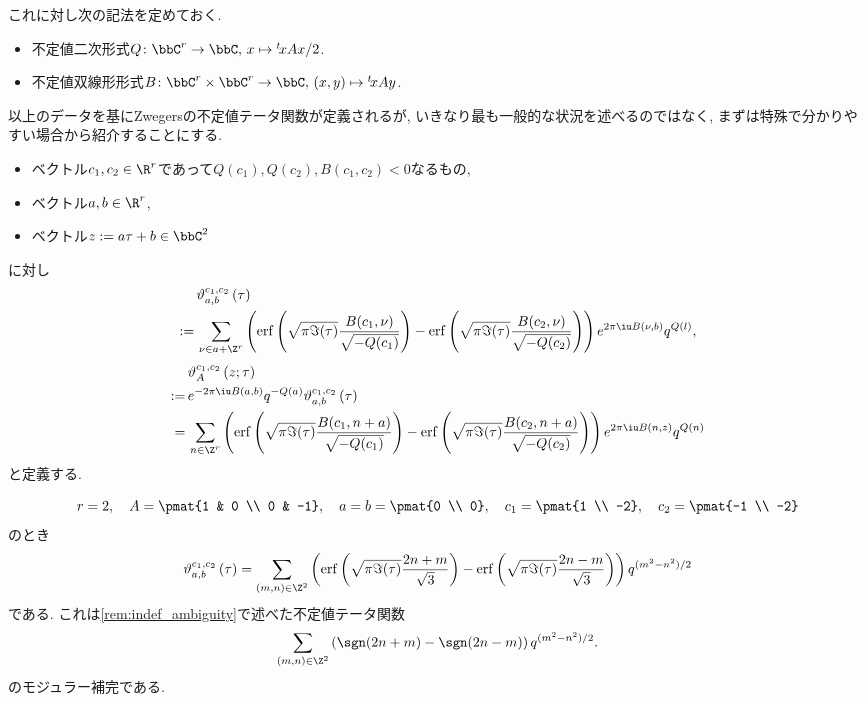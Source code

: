 \documentclass[11pt,b5paper,oneside,lualatex]{ltjsarticle} %
\DeclareMathOperator{\erf}{erf}
\numberwithin{equation}{section} %
\begin{document}
これに対し次の記法を定めておく. 

\begin{nota}
	\begin{itemize}
		\item 不定値二次形式$ Q \colon \bbC^r \to \bbC, \, x \mapsto {}^t\!x A x /2 $.
		\item 不定値双線形形式$ B \colon \bbC^r \times \bbC^r \to \bbC, \, (x, y) \mapsto {}^t\!x A y $.
	\end{itemize}
\end{nota}

以上のデータを基にZwegersの不定値テータ関数が定義されるが, いきなり最も一般的な状況を述べるのではなく, まずは特殊で分かりやすい場合から紹介することにする. 

\begin{dfn}
	\label{dfn:Zwegers_theta_special}
	\leavevmode %
	\begin{itemize}
		\item ベクトル$ c_1, c_2 \in \R^r $であって$ Q(c_1), Q(c_2), B(c_1, c_2) < 0 $なるもの,
		\item ベクトル$ a, b \in \R^r $,
		\item ベクトル$ z := a \tau + b \in \bbC^2 $
	\end{itemize}
	に対し	
	\begin{align}
		&\vartheta_{a, b}^{c_1, c_2} \left( \tau \right)
		\\
		:= \,
		&\sum_{\nu \in a + \Z^r}
		\left( \erf \left( \sqrt{\pi \Im(\tau)} \frac{B(c_1, \nu)}{\sqrt{-Q(c_1)}} \right) - \erf \left( \sqrt{\pi \Im(\tau)} \frac{B(c_2, \nu)}{\sqrt{-Q(c_2)}} \right) \right)
		e^{2\pi \iu B(\nu, b)} q^{Q(l)},
	\end{align}
	\begin{align}
		&\vartheta_{A}^{c_1, c_2} \left( z; \tau \right)
		\\
		:= \,
		&e^{-2\pi \iu B(a, b)} q^{-Q(a)} \vartheta_{a, b}^{c_1, c_2} \left( \tau \right)
		\\
		= \,
		&\sum_{n \in \Z^r}
		\left( \erf \left( \sqrt{\pi \Im(\tau)} \frac{B(c_1, n + a)}{\sqrt{-Q(c_1)}} \right) - \erf \left( \sqrt{\pi \Im(\tau)} \frac{B(c_2, n + a)}{\sqrt{-Q(c_2)}} \right) \right)
		e^{2\pi \iu B(n, z)} q^{Q(n)}
	\end{align}
	と定義する. 
\end{dfn}

\begin{ex}
	\[
	 r = 2, \quad
	 A = \pmat{1 & 0 \\ 0 & -1}, \quad
	 a = b = \pmat{0 \\ 0}, \quad
	 c_1= \pmat{1 \\ -2}, \quad
	 c_2= \pmat{-1 \\ -2}
	\]
	のとき
	\[
	\vartheta_{a, b}^{c_1, c_2} \left( \tau \right)
	=
	\sum_{(m, n) \in \Z^2}
	\left( \erf \left( \sqrt{\pi \Im(\tau)} \frac{2n+m}{\sqrt{3}} \right) - \erf \left( \sqrt{\pi \Im(\tau)} \frac{2n-m}{\sqrt{3}} \right) \right)
	q^{(m^2 - n^2)/2}
	\]
	である. 
	これは\cref{rem:indef_ambiguity}で述べた不定値テータ関数
	\[
	\sum_{(m, n) \in \Z^2} \left( \sgn(2n+m) - \sgn(2n-m) \right) q^{(m^2 - n^2)/2}.
	\]
	のモジュラー補完である. 
\end{ex}
\end{document}
